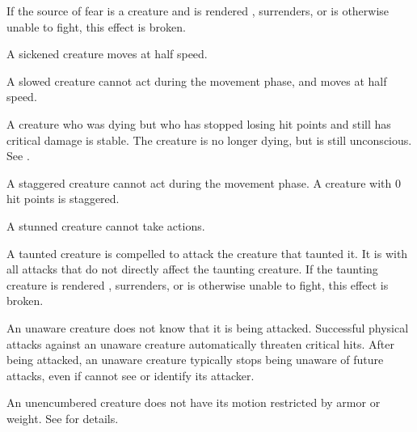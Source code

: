 If the source of fear is a creature and is rendered \helpless, surrenders, or is otherwise unable to fight, this effect is broken.

 A sickened creature moves at half speed.

 A slowed creature cannot act during the movement phase, and moves at half speed.

 A creature who was dying but who has stopped losing hit points and still has critical damage is stable. The creature is no longer dying, but is still unconscious. See .

 A staggered creature cannot act during the movement phase. A creature with 0 hit points is staggered.

 A stunned creature cannot take actions.

 A taunted creature is compelled to attack the creature that taunted it.
It is \impaired with all attacks that do not directly affect the taunting creature.
If the taunting creature is rendered \helpless, surrenders, or is otherwise unable to fight, this effect is broken.

 An unaware creature does not know that it is being attacked. Successful physical attacks against an unaware creature automatically threaten critical hits. After being attacked, an unaware creature typically stops being unaware of future attacks, even if cannot see or identify its attacker.

 An unencumbered creature does not have its motion restricted by armor or weight. See  for details.
